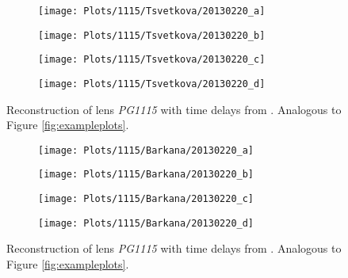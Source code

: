 \documentclass[10pt]{article}
\begin{document}
\begin{figure}[ht!]
 \centering
 \begin{subfigure}{.48\textwidth}
  \centering
  \texttt{[image: Plots/1115/Tsvetkova/20130220\_a]}
  \caption{}
 \end{subfigure}
 \begin{subfigure}{.48\textwidth}
  \centering
  \texttt{[image: Plots/1115/Tsvetkova/20130220\_b]}
  \caption{}
 \end{subfigure}
 
 \begin{subfigure}{.48\textwidth}
  \centering
  \texttt{[image: Plots/1115/Tsvetkova/20130220\_c]}
  \caption{}
 \end{subfigure}
 \begin{subfigure}{.48\textwidth}
  \centering
  \texttt{[image: Plots/1115/Tsvetkova/20130220\_d]}
  \caption{}
 \end{subfigure}
 \captionsetup{width=.93\textwidth}
 \caption{Reconstruction of lens \textit{PG1115} with time delays from \cite{2010MNRAS.406.2764T}. Analogous to Figure \ref{fig:exampleplots}.}
 \label{fig:tsvetkova}
\end{figure}

\begin{figure}[ht!]
 \centering
 \begin{subfigure}{.48\textwidth}
  \centering
  \texttt{[image: Plots/1115/Barkana/20130220\_a]}
  \caption{}
 \end{subfigure}
 \begin{subfigure}{.48\textwidth}
  \centering
  \texttt{[image: Plots/1115/Barkana/20130220\_b]}
  \caption{}
 \end{subfigure}
 
 \begin{subfigure}{.48\textwidth}
  \centering
  \texttt{[image: Plots/1115/Barkana/20130220\_c]}
  \caption{}
 \end{subfigure}
 \begin{subfigure}{.48\textwidth}
  \centering
  \texttt{[image: Plots/1115/Barkana/20130220\_d]}
  \caption{}
 \end{subfigure}
 \captionsetup{width=.93\textwidth}
 \caption{Reconstruction of lens \textit{PG1115} with time delays from \cite{1997ApJ...489...21B}. Analogous to Figure \ref{fig:exampleplots}.}
 \label{fig:barkana}
\end{figure}
\end{document}
